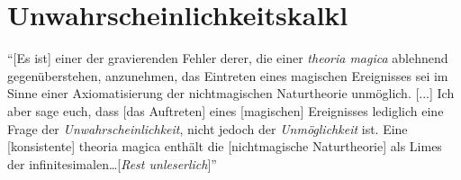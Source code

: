 \chapter[tocentry=Unwahrscheinlichkeitskalkül, head=Unwahrscheinlichkeitskalkül]{Unwahrscheinlichkeitskalk\uech l}
"`[Es ist] einer der gravierenden Fehler derer, die einer \emph{theoria magica} ablehnend gegenüberstehen, anzunehmen, das Eintreten eines magischen Ereignisses sei im Sinne einer Axiomatisierung der nichtmagischen Naturtheorie unmöglich. [...] Ich aber sage euch, dass [das Auftreten] eines [magischen] Ereignisses lediglich eine Frage der \emph{Unwahrscheinlichkeit}, nicht jedoch der \emph{Unmöglichkeit} ist. Eine [konsistente] theoria magica enthält die [nichtmagische Naturtheorie] als Limes der infinitesimalen\ldots [\textit{Rest unleserlich}]"' \cite{apokryphen}

